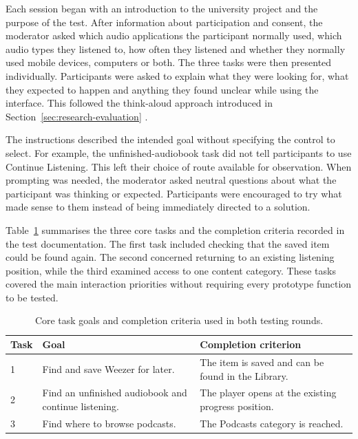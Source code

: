 Each session began with an introduction to the university project and the
purpose of the test. After information about participation and consent, the
moderator asked which audio applications the participant normally used,
which audio types they listened to, how often they listened and whether
they normally used mobile devices, computers or both. The three tasks were
then presented individually. Participants were asked to explain what they
were looking for, what they expected to happen and anything they found
unclear while using the interface. This followed the think-aloud approach
introduced in Section~\ref{sec:research-evaluation}
\cite[Sec.~``Defining Thinking Aloud Testing'']{nielsenthinkaloud}.

The instructions described the intended goal without specifying the control
to select. For example, the unfinished-audiobook task did not tell
participants to use Continue Listening. This left their choice of route
available for observation. When prompting was needed, the moderator asked
neutral questions about what the participant was thinking or expected.
Participants were encouraged to try what made sense to them instead of
being immediately directed to a solution.

Table~\ref{tab:usability-tasks} summarises the three core tasks and the
completion criteria recorded in the test documentation. The first task
included checking that the saved item could be found again. The second
concerned returning to an existing listening position, while the third
examined access to one content category. These tasks covered the main
interaction priorities without requiring every prototype function to be
tested.

\begin{table}[htbp]
  \centering
  \caption{Core task goals and completion criteria used in both testing rounds.}
  \label{tab:usability-tasks}
  \begingroup
  \small
  \renewcommand{\arraystretch}{1.25}
  \begin{tabular}{@{}p{}p{}p{}@{}}
    \hline
    \textbf{Task} & \textbf{Goal} & \textbf{Completion criterion} \\
    \hline
    1 & Find and save Weezer for later. &
    The item is saved and can be found in the Library. \\[3pt]
    2 & Find an unfinished audiobook and continue listening. &
    The player opens at the existing progress position. \\[3pt]
    3 & Find where to browse podcasts. &
    The Podcasts category is reached. \\
    \hline
  \end{tabular}
  \endgroup
\end{table}

